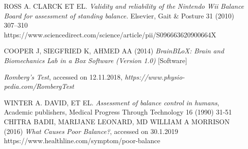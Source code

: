 \documentclass[twoside]{ctuthesis}
\theoremstyle{plain}
\theoremstyle{definition}
\theoremstyle{note}
\begin{document}
\begin{thebibliography}{9}
	ROSS A. CLARCK ET EL. \textit{Validity and reliability of the Nintendo Wii Balance Board for assessment of standing balance.} Elsevier, Gait \& Posture 31 (2010) 307–310\\
	https://www.sciencedirect.com/science/article/pii/S096663620900664X
	
	\uppercase{Cooper J, Siegfried K, Ahmed AA} (2014) \textit{BrainBLoX: Brain and Biomechanics Lab in a Box Software (Version 1.0)} [Software]
	
	\textit{Romberg's Test}, accessed on 12.11.2018, \textit{https://www.physio-pedia.com/Romberg\textunderscore Test}
	
	\uppercase{Winter A. David, Et El.} \textit{Assessment of balance control in humans}, Academic publishers, Medical Progress Through Technology 16 (1990) 31-51\\
	
	\uppercase{Chitra Badii, Marijane Leonard, MD William A Morrison} (2016) \textit{What Causes Poor Balance?}, accessed on 30.1.2019\\
	https://www.healthline.com/symptom/poor-balance
	
	
\end{thebibliography}



\end{document}
